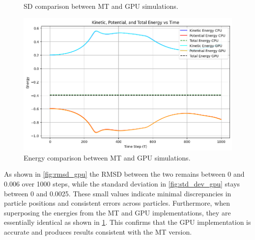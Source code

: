 \documentclass[english,11pt]{article}
\begin{document}
\begin{figure}[h!]
\begin{minipage}{0.45\textwidth}
        \caption{SD comparison between MT and GPU simulations.}
        \label{fig:std_dev_gpu}
    \end{minipage}
    \begin{minipage}{0.45\textwidth}
        \centering
        \includegraphics[width=\textwidth]{graph/E_GPUCPU.png}
        \caption{Energy comparison between MT and GPU simulations.}
        \label{fig:E_gpu}
    \end{minipage}
\end{figure}

As shown in \ref{fig:rmsd_gpu} the RMSD between the two remains between 0 and 0.006 over 1000 steps, while the standard deviation in \ref{fig:std_dev_gpu} stays between 0 and 0.0025. These small values indicate minimal discrepancies in particle positions and consistent errors across particles. Furthermore, when superposing the energies from the MT and GPU implementations, they are essentially identical as shown in \ref{fig:E_gpu}. This confirms that the GPU implementation is accurate and produces results consistent with the MT version.
\end{document}

